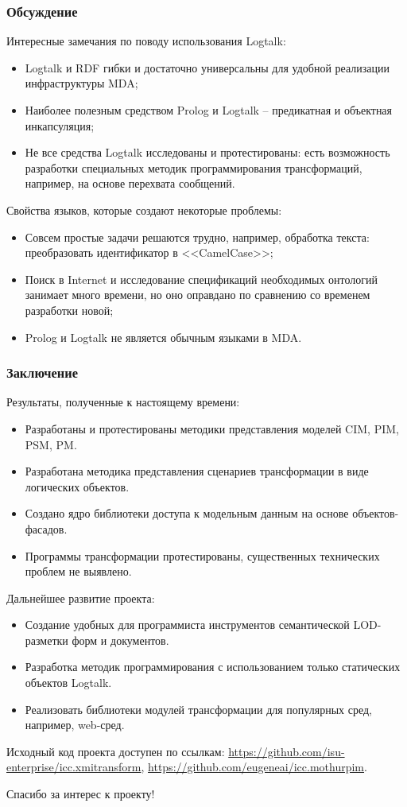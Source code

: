 \documentclass[10pt]{beamer}
\begin{document}
\begin{frame}
  \frametitle{Обсуждение}
  Интересные замечания по поводу использования Logtalk:
  \begin{itemize}
  \item Logtalk и RDF гибки и достаточно универсальны для удобной реализации инфраструктуры MDA;
  \item Наиболее полезным средством Prolog и Logtalk -- предикатная и объектная инкапсуляция;
  \item Не все средства Logtalk исследованы и протестированы: есть возможность разработки специальных методик программирования трансформаций, например, на основе перехвата сообщений.
  \end{itemize}
  Свойства языков, которые создают некоторые проблемы:
  \begin{itemize}
  \item Совсем простые задачи решаются трудно, например, обработка текста: преобразовать идентификатор в <<CamelCase>>;
  \item Поиск в Internet и исследование спецификаций необходимых онтологий занимает много времени, но оно оправдано по сравнению со временем разработки новой;
  \item Prolog и Logtalk не является обычным языками в MDA.
  \end{itemize}
\end{frame}

\begin{frame}
  \frametitle{Заключение}
  Результаты, полученные к настоящему времени:
  \begin{itemize}
  \item Разработаны и протестированы методики представления моделей CIM, PIM, PSM, PM.
  \item Разработана методика представления сценариев трансформации в виде логических объектов.
  \item Создано ядро библиотеки доступа к модельным данным на основе объектов-фасадов.
  \item Программы трансформации протестированы, существенных технических проблем не выявлено.
  \end{itemize}
  Дальнейшее развитие проекта:
  \begin{itemize}
  \item Создание удобных для программиста инструментов семантической LOD-разметки форм и документов.
  \item Разработка методик программирования с использованием только статических объектов Logtalk.
  \item Реализовать библиотеки модулей трансформации для популярных сред, например, web-сред.
  \end{itemize}
  Исходный код проекта доступен по ссылкам: \url{https://github.com/isu-enterprise/icc.xmitransform}, \url{https://github.com/eugeneai/icc.mothurpim}.
\end{frame}

\begin{frame}
  \begin{center}
  \Large Спасибо за интерес к проекту!
\end{center}
\end{frame}
\end{document}

